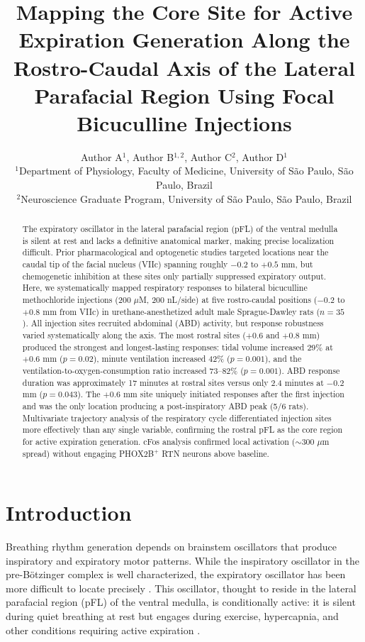\documentclass[12pt]{article}
\title{Mapping the Core Site for Active Expiration Generation Along the Rostro-Caudal Axis of the Lateral Parafacial Region Using Focal Bicuculline Injections}
\author{Author A$^{1}$, Author B$^{1,2}$, Author C$^{2}$, Author D$^{1}$ \\
\small $^{1}$Department of Physiology, Faculty of Medicine, University of S\~{a}o Paulo, S\~{a}o Paulo, Brazil \\
\small $^{2}$Neuroscience Graduate Program, University of S\~{a}o Paulo, S\~{a}o Paulo, Brazil}
\date{}
\begin{document}
\maketitle

\begin{abstract}
The expiratory oscillator in the lateral parafacial region (pFL) of the ventral medulla is silent at rest and lacks a definitive anatomical marker, making precise localization difficult. Prior pharmacological and optogenetic studies targeted locations near the caudal tip of the facial nucleus (VIIc) spanning roughly $-0.2$ to $+0.5$ mm, but chemogenetic inhibition at these sites only partially suppressed expiratory output. Here, we systematically mapped respiratory responses to bilateral bicuculline methochloride injections (200 $\mu$M, 200 nL/side) at five rostro-caudal positions ($-0.2$ to $+0.8$ mm from VIIc) in urethane-anesthetized adult male Sprague-Dawley rats ($n = 35$). All injection sites recruited abdominal (ABD) activity, but response robustness varied systematically along the axis. The most rostral sites ($+0.6$ and $+0.8$ mm) produced the strongest and longest-lasting responses: tidal volume increased 29\% at $+0.6$ mm ($p = 0.02$), minute ventilation increased 42\% ($p = 0.001$), and the ventilation-to-oxygen-consumption ratio increased 73--82\% ($p = 0.001$). ABD response duration was approximately 17 minutes at rostral sites versus only 2.4 minutes at $-0.2$ mm ($p = 0.043$). The $+0.6$ mm site uniquely initiated responses after the first injection and was the only location producing a post-inspiratory ABD peak (5/6 rats). Multivariate trajectory analysis of the respiratory cycle differentiated injection sites more effectively than any single variable, confirming the rostral pFL as the core region for active expiration generation. cFos analysis confirmed local activation ($\sim$300 $\mu$m spread) without engaging PHOX2B$^+$ RTN neurons above baseline.
\end{abstract}

\section{Introduction}

Breathing rhythm generation depends on brainstem oscillators that produce inspiratory and expiratory motor patterns. While the inspiratory oscillator in the pre-B\"{o}tzinger complex is well characterized, the expiratory oscillator has been more difficult to locate precisely \citep{feldman2013breathing, janczewski2006role}. This oscillator, thought to reside in the lateral parafacial region (pFL) of the ventral medulla, is conditionally active: it is silent during quiet breathing at rest but engages during exercise, hypercapnia, and other conditions requiring active expiration \citep{pagliardini2011active, abdala2009abdominal}.
\end{document}

